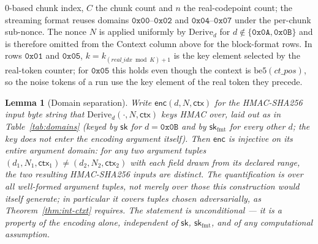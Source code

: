 \documentclass[11pt,a4paper]{article}
\newtheorem{lemma}[theorem]{Lemma}
\begin{document}
\begin{table}[h]
{0-based chunk index, $C$ the chunk count and $n$ the real-codepoint count;
the streaming format reuses domains $\texttt{0x00}$--$\texttt{0x02}$ and
$\texttt{0x04}$--$\texttt{0x07}$ under the per-chunk sub-nonce. The nonce $N$ is applied uniformly by $\mathrm{Derive}_d$ for
$d\notin\{\texttt{0x0A},\texttt{0x0B}\}$ and is therefore omitted from
the Context column above for the block-format rows. In rows $\texttt{0x01}$ and $\texttt{0x05}$,
$k=k_{(real\_idx \bmod K)+1}$ is the key element selected by the
real-token counter; for $\texttt{0x05}$ this holds even though the context
is $\mathrm{be5}(ct\_pos)$, so the noise tokens of a run use the key
element of the real token they precede.}
\label{tab:domains}
\end{table}

\begin{lemma}[Domain separation]\label{lem:domsep}
Write $\mathsf{enc}(d,N,\mathsf{ctx})$ for the HMAC-SHA256 input byte
string that $\mathrm{Derive}_d(\cdot,N,\mathsf{ctx})$ keys HMAC over,
laid out as in Table~\ref{tab:domains} (keyed by $\mathsf{sk}$ for
$d=\texttt{0x0B}$ and by $\mathsf{sk}_{\mathrm{fmt}}$ for every other
$d$; the key does not enter the encoding argument itself). Then
$\mathsf{enc}$ is injective on its \emph{entire} argument domain: for any
two argument tuples
$(d_1,N_1,\mathsf{ctx}_1)\neq(d_2,N_2,\mathsf{ctx}_2)$ with each field
drawn from its declared range, the two resulting HMAC-SHA256 inputs are
distinct. The quantification is over all well-formed argument tuples,
\emph{not} merely over those this construction would itself generate; in
particular it covers tuples chosen adversarially, as
Theorem~\ref{thm:int-ctxt} requires. The statement is unconditional — it
is a property of the encoding alone, independent of $\mathsf{sk}$,
$\mathsf{sk}_{\mathrm{fmt}}$, and of any computational assumption.
\end{lemma}
\end{document}
